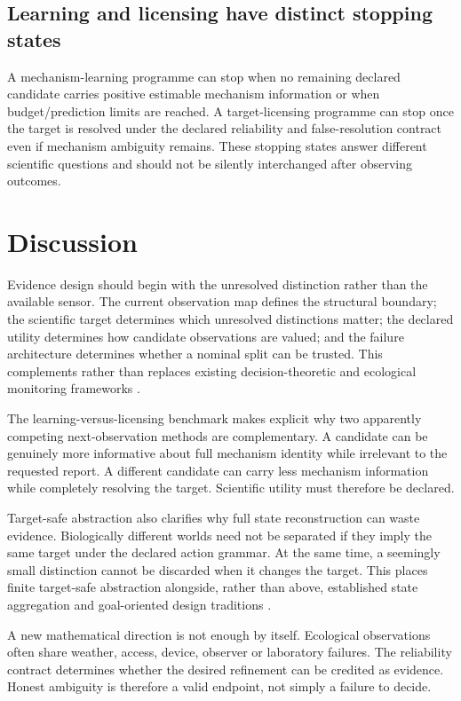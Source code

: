\documentclass[11pt]{article}
\begin{document}
\subsection{Learning and licensing have distinct stopping states}
A mechanism-learning programme can stop when no remaining declared candidate carries positive estimable mechanism information or when budget/prediction limits are reached. A target-licensing programme can stop once the target is resolved under the declared reliability and false-resolution contract even if mechanism ambiguity remains. These stopping states answer different scientific questions and should not be silently interchanged after observing outcomes.

\section{Discussion}
Evidence design should begin with the unresolved distinction rather than the available sensor. The current observation map defines the structural boundary; the scientific target determines which unresolved distinctions matter; the declared utility determines how candidate observations are valued; and the failure architecture determines whether a nominal split can be trusted. This complements rather than replaces existing decision-theoretic and ecological monitoring frameworks \cite{ChalonerVerdinelli1995,CanessaEtAl2015,NicholsWilliams2006,Dietze2017}.

The learning-versus-licensing benchmark makes explicit why two apparently competing next-observation methods are complementary. A candidate can be genuinely more informative about full mechanism identity while irrelevant to the requested report. A different candidate can carry less mechanism information while completely resolving the target. Scientific utility must therefore be declared.

Target-safe abstraction also clarifies why full state reconstruction can waste evidence. Biologically different worlds need not be separated if they imply the same target under the declared action grammar. At the same time, a seemingly small distinction cannot be discarded when it changes the target. This places finite target-safe abstraction alongside, rather than above, established state aggregation and goal-oriented design traditions \cite{GivanDeanGreig2003,VanlierEtAl2012,AttiaEtAl2018}.

A new mathematical direction is not enough by itself. Ecological observations often share weather, access, device, observer or laboratory failures. The reliability contract determines whether the desired refinement can be credited as evidence. Honest ambiguity is therefore a valid endpoint, not simply a failure to decide.
\end{document}
